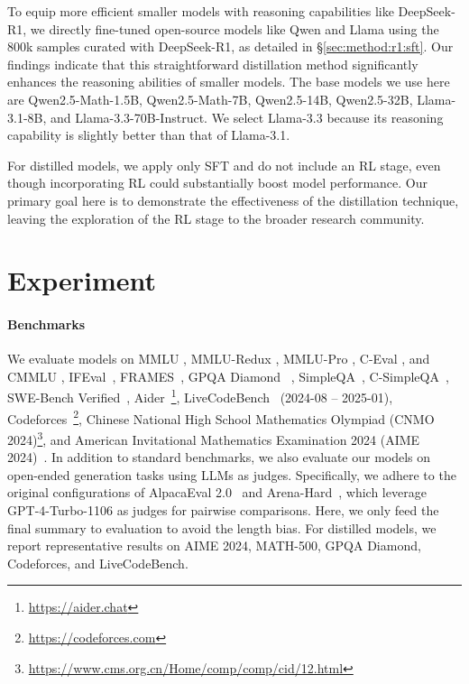 \documentclass[11pt, a4paper, logo, copyright, nonumbering]{deepseek}
\begin{document}
To equip more efficient smaller models with reasoning capabilities like DeepSeek-R1, we directly fine-tuned open-source models like Qwen \citep{qwen2_5} and Llama \citep{llama3_1_405b} using the 800k samples curated with DeepSeek-R1, as detailed in \S \ref{sec:method:r1:sft}.
Our findings indicate that this straightforward distillation method significantly enhances the reasoning abilities of smaller models.
The base models we use here are Qwen2.5-Math-1.5B, Qwen2.5-Math-7B, Qwen2.5-14B, Qwen2.5-32B, Llama-3.1-8B, and Llama-3.3-70B-Instruct. We select Llama-3.3 because its reasoning capability is slightly better than that of Llama-3.1.

For distilled models, we apply only SFT and do not include an RL stage, even though incorporating RL could substantially boost model performance. Our primary goal here is to demonstrate the effectiveness of the distillation technique, leaving the exploration of the RL stage to the broader research community.

\section{Experiment}

\paragraph{Benchmarks} We evaluate models on MMLU \citep{mmlu}, MMLU-Redux \citep{mmlu_redux}, MMLU-Pro \citep{mmlu_pro}, C-Eval \citep{ceval}, and CMMLU \citep{cmmlu}, IFEval~\citep{IFeval}, FRAMES~\citep{frames}, GPQA Diamond ~\citep{gpqa}, SimpleQA~\citep{simpleqa}, C-SimpleQA~\citep{csimpleqa}, SWE-Bench Verified~\citep{swe_verified}, Aider~\footnote{\url{https://aider.chat}}, LiveCodeBench~\citep{livecodebench} (2024-08 -- 2025-01), Codeforces~\footnote{\url{https://codeforces.com}}, Chinese National High School Mathematics Olympiad (CNMO 2024)\footnote{\url{https://www.cms.org.cn/Home/comp/comp/cid/12.html}}, and American Invitational Mathematics Examination 2024 (AIME 2024)~\citep{AIME2024}. 
In addition to standard benchmarks, we also evaluate our models on open-ended generation tasks using LLMs as judges. 
Specifically, we adhere to the original configurations of AlpacaEval 2.0~\citep{alpaca2.0} and Arena-Hard~\citep{li2024crowdsourced}, which leverage GPT-4-Turbo-1106 as judges for pairwise comparisons. Here, we only feed the final summary to evaluation to avoid the length bias. 
For distilled models, we report representative results on AIME 2024, MATH-500, GPQA Diamond, Codeforces, and LiveCodeBench.
\end{document}
